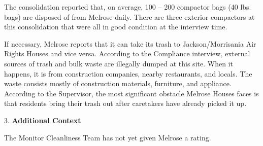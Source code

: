 The consolidation reported that, on average, 100 -- 200 compactor bags (40 lbs. bags) are disposed of from Melrose daily. There are three exterior compactors at this consolidation that were all in good condition at the interview time.

If necessary, Melrose reports that it can take its trash to  Jackson/Morrisania Air Rights Houses and vice versa. According to the Compliance interview, external sources of trash and bulk waste are illegally dumped at this site. When it happens, it is from construction companies, nearby restaurants, and locals. The waste consists mostly of construction materials, furniture, and appliance. According to the  Supervisor, the most significant obstacle Melrose Houses faces is that residents bring their trash out after caretakers have already picked it up.  

3. \textbf{Additional Context}

The Monitor Cleanliness Team has not yet given Melrose a rating.